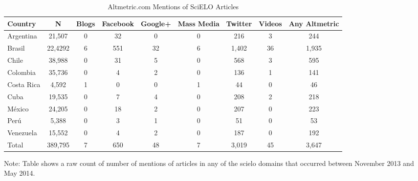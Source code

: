 \begin{table}
\centering
\begin{threeparttable}
\caption{Altmetric.com Mentions of SciELO Articles} \label{altmetric_raw_counts_Nov2013_May2014_scielo}
\begin{tabular}{@{}lcccccccc@{}}
\toprule
Country &   N   &   Blogs   &   Facebook    &   Google+ &   Mass Media  &   Twitter &   Videos  &   Any Altmetric   \\ \midrule
Argentina   &   21,507   &   0   &   32  &   0   &   0   &   216 &   3   &   244 \\
Brasil  &   22,4292  &   6   &   551 &   32  &   6   &   1,402    &   36  &   1,935    \\
Chile   &   38,988   &   0   &   31  &   5   &   0   &   568 &   3   &   595 \\
Colombia    &   35,736   &   0   &   4   &   2   &   0   &   136 &   1   &   141 \\
Costa Rica  &   4,592    &   1   &   0   &   0   &   1   &   44  &   0   &   46  \\
Cuba    &   19,535   &   0   &   7   &   4   &   0   &   208 &   2   &   218 \\
México &   24,205   &   0   &   18  &   2   &   0   &   207 &   0   &   223 \\
Perú   &   5,388    &   0   &   3   &   1   &   0   &   51  &   0   &   53  \\
Venezuela   &   15,552   &   0   &   4   &   2   &   0   &   187 &   0   &   192 \\ \midrule
Total   &   389,795  &   7   &   650 &   48  &   7   &   3,019    &   45  &   3,647    \\ \bottomrule
\end{tabular}
\begin{tablenotes}
\small
\item Note: Table shows a raw count of number of mentions of articles in any of the scielo domains that occurred between November 2013 and May 2014.
\end{tablenotes}
\end{threeparttable}
\end{table}

